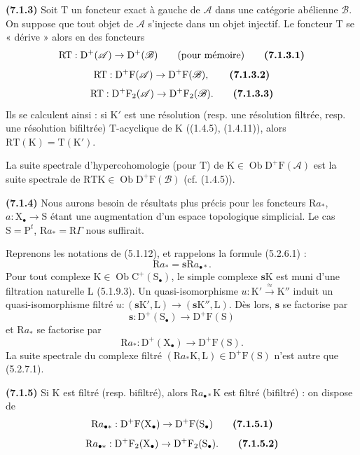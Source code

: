 \documentclass[11pt,leqno]{article}
\begin{document}
\textbf{(7.1.3)} Soit \(\mathrm{T}\) un foncteur exact à gauche de \(\mathscr{A}\) dans une catégorie abélienne \(\mathscr{B}\). On suppose que tout objet de \(\mathscr{A}\) s’injecte dans un objet injectif. Le foncteur \(\mathrm{T}\) se « dérive » alors en des foncteurs
\[
\mathrm{RT}:\mathrm{D}^{+}(\mathscr{A})\to\mathrm{D}^{+}(\mathscr{B})
\qquad\text{(pour mémoire)}
\tag*{\textbf{(7.1.3.1)}}
\]
\[
\mathrm{RT}:\mathrm{D}^{+}\mathrm{F}(\mathscr{A})
\to\mathrm{D}^{+}\mathrm{F}(\mathscr{B}),
\tag*{\textbf{(7.1.3.2)}}
\]
\[
\mathrm{RT}:\mathrm{D}^{+}\mathrm{F}_2(\mathscr{A})
\to\mathrm{D}^{+}\mathrm{F}_2(\mathscr{B}).
\tag*{\textbf{(7.1.3.3)}}
\]
Ils se calculent ainsi : si \(\mathrm{K}'\) est une résolution (resp. une résolution filtrée, resp. une résolution bifiltrée) \(\mathrm{T}\)-acyclique de \(\mathrm{K}\) ((1.4.5), (1.4.11)), alors \(\mathrm{RT}(\mathrm{K})=\mathrm{T}(\mathrm{K}')\).

La suite spectrale d’hypercohomologie (pour \(\mathrm{T}\)) de \(\mathrm{K}\in\operatorname{Ob}\mathrm{D}^{+}\mathrm{F}(\mathscr{A})\) est la suite spectrale de \(\mathrm{RTK}\in\operatorname{Ob}\mathrm{D}^{+}\mathrm{F}(\mathscr{B})\) (cf. (1.4.5)).

\textbf{(7.1.4)} Nous aurons besoin de résultats plus précis pour les foncteurs \(\mathrm{R}a_{\ast}\), \(a:\mathrm{X}_{\bullet}\to\mathrm{S}\) étant une augmentation d’un espace topologique simplicial. Le cas \(\mathrm{S}=\mathrm{P}^{t}\), \(\mathrm{R}a_{\ast}=\mathrm{R}\Gamma\) nous suffirait.

Reprenons les notations de (5.1.12), et rappelons la formule (5.2.6.1) :
\[
\mathrm{R}a_{\ast}=\boldsymbol{s}\mathrm{R}a_{\bullet\ast}.
\]
Pour tout complexe \(\mathrm{K}\in\operatorname{Ob}\mathrm{C}^{+}(\mathrm{S}_{\bullet})\), le simple complexe \(\boldsymbol{s}\mathrm{K}\) est muni d’une filtration naturelle \(\mathrm{L}\) (5.1.9.3). Un quasi-isomorphisme \(u:\mathrm{K}'\xrightarrow{\approx}\mathrm{K}''\) induit un quasi-isomorphisme filtré \(u:(\boldsymbol{s}\mathrm{K}',\mathrm{L})\to(\boldsymbol{s}\mathrm{K}'',\mathrm{L})\). Dès lors, \(\boldsymbol{s}\) se factorise par
\[
\boldsymbol{s}:\mathrm{D}^{+}(\mathrm{S}_{\bullet})
\to\mathrm{D}^{+}\mathrm{F}(\mathrm{S})
\]
et \(\mathrm{R}a_{\ast}\) se factorise par
\[
\mathrm{R}a_{\ast}:\mathrm{D}^{+}(\mathrm{X}_{\bullet})
\to\mathrm{D}^{+}\mathrm{F}(\mathrm{S}).
\]
La suite spectrale du complexe filtré \((\mathrm{R}a_{\ast}\mathrm{K},\mathrm{L})\in\mathrm{D}^{+}\mathrm{F}(\mathrm{S})\) n’est autre que (5.2.7.1).

\textbf{(7.1.5)} Si \(\mathrm{K}\) est filtré (resp. bifiltré), alors \(\mathrm{R}a_{\bullet\ast}\mathrm{K}\) est filtré (bifiltré) : on dispose de
\[
\mathrm{R}a_{\bullet\ast}:
\mathrm{D}^{+}\mathrm{F}(\mathrm{X}_{\bullet})
\to\mathrm{D}^{+}\mathrm{F}(\mathrm{S}_{\bullet})
\tag*{\textbf{(7.1.5.1)}}
\]
\[
\mathrm{R}a_{\bullet\ast}:
\mathrm{D}^{+}\mathrm{F}_2(\mathrm{X}_{\bullet})
\to\mathrm{D}^{+}\mathrm{F}_2(\mathrm{S}_{\bullet}).
\tag*{\textbf{(7.1.5.2)}}
\]
\end{document}
